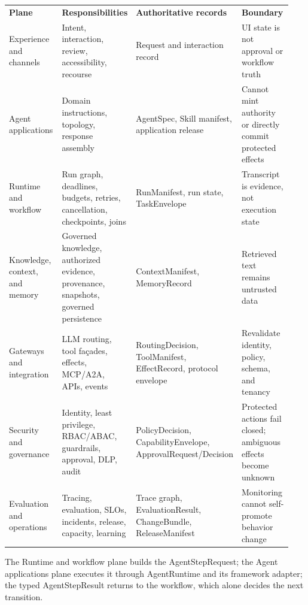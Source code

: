 \BookTableStart
\fontsize{7.2}{9}\selectfont
\begin{tabular}{@{}Y{0.2350\linewidth}Y{0.2350\linewidth}Y{0.2350\linewidth}Y{0.2350\linewidth}@{}}
\color{white}\bfseries \textbf{Plane} & \color{white}\bfseries \textbf{Responsibilities} & \color{white}\bfseries \textbf{Authoritative records} & \color{white}\bfseries \textbf{Boundary} \\
Experience and channels & Intent, interaction, review, accessibility, recourse & Request and interaction record & UI state is not approval or workflow truth \\
Agent applications & Domain instructions, topology, response assembly & AgentSpec, Skill manifest, application release & Cannot mint authority or directly commit protected effects \\
Runtime and workflow & Run graph, deadlines, budgets, retries, cancellation, checkpoints, joins & RunManifest, run state, TaskEnvelope & Transcript is evidence, not execution state \\
Knowledge, context, and memory & Governed knowledge, authorized evidence, provenance, snapshots, governed persistence & ContextManifest, MemoryRecord & Retrieved text remains untrusted data \\
Gateways and integration & LLM routing, tool façades, effects, MCP/A2A, APIs, events & RoutingDecision, ToolManifest, EffectRecord, protocol envelope & Revalidate identity, policy, schema, and tenancy \\
Security and governance & Identity, least privilege, RBAC/ABAC, guardrails, approval, DLP, audit & PolicyDecision, CapabilityEnvelope, ApprovalRequest/Decision & Protected actions fail closed; ambiguous effects become unknown \\
Evaluation and operations & Tracing, evaluation, SLOs, incidents, release, capacity, learning & Trace graph, EvaluationResult, ChangeBundle, ReleaseManifest & Monitoring cannot self-promote behavior change \\
\end{tabular}
\BookTableEnd

The Runtime and workflow plane builds the AgentStepRequest; the Agent applications plane executes it through AgentRuntime and its framework adapter; the typed AgentStepResult returns to the workflow, which alone decides the next transition.\par

